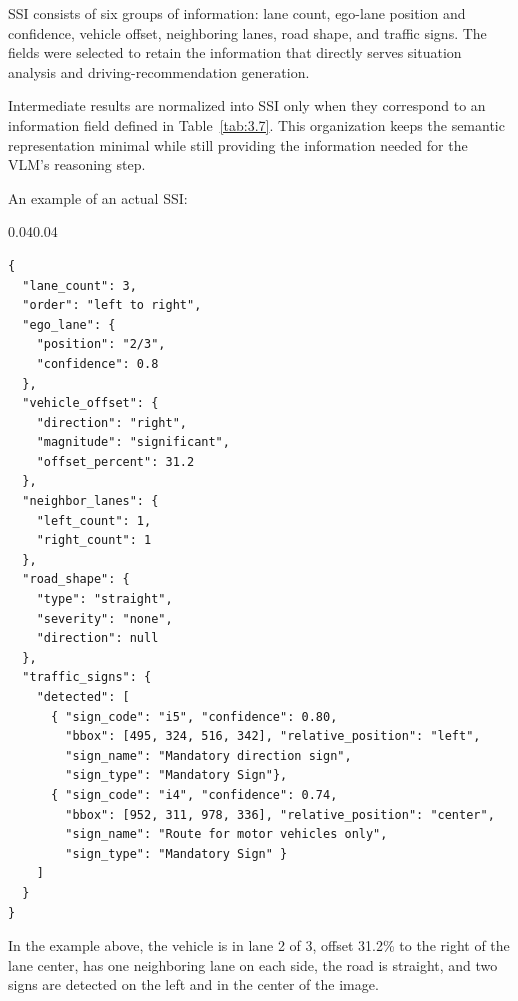 \documentclass[12pt,a4paper]{report}
\begin{document}
SSI consists of six groups of information: lane count, ego-lane position and confidence, vehicle offset, neighboring lanes, road shape, and traffic signs. The fields were selected to retain the information that directly serves situation analysis and driving-recommendation generation.

Intermediate results are normalized into SSI only when they correspond to an information field defined in Table~\ref{tab:3.7}. This organization keeps the semantic representation minimal while still providing the information needed for the VLM's reasoning step.

An example of an actual SSI:

\begin{adjustwidth}{0.04\linewidth}{0.04\linewidth}
\begin{framed}
\footnotesize
\begin{verbatim}
{
  "lane_count": 3,
  "order": "left to right",
  "ego_lane": {
    "position": "2/3",
    "confidence": 0.8
  },
  "vehicle_offset": {
    "direction": "right",
    "magnitude": "significant",
    "offset_percent": 31.2
  },
  "neighbor_lanes": {
    "left_count": 1,
    "right_count": 1
  },
  "road_shape": {
    "type": "straight",
    "severity": "none",
    "direction": null
  },
  "traffic_signs": {
    "detected": [
      { "sign_code": "i5", "confidence": 0.80,
        "bbox": [495, 324, 516, 342], "relative_position": "left",
        "sign_name": "Mandatory direction sign",
        "sign_type": "Mandatory Sign"},
      { "sign_code": "i4", "confidence": 0.74,
        "bbox": [952, 311, 978, 336], "relative_position": "center",
        "sign_name": "Route for motor vehicles only",
        "sign_type": "Mandatory Sign" }
    ]
  }
}
\end{verbatim}
\end{framed}
\end{adjustwidth}

In the example above, the vehicle is in lane 2 of 3, offset 31.2\% to the right of the lane center, has one neighboring lane on each side, the road is straight, and two signs are detected on the left and in the center of the image.
\end{document}
